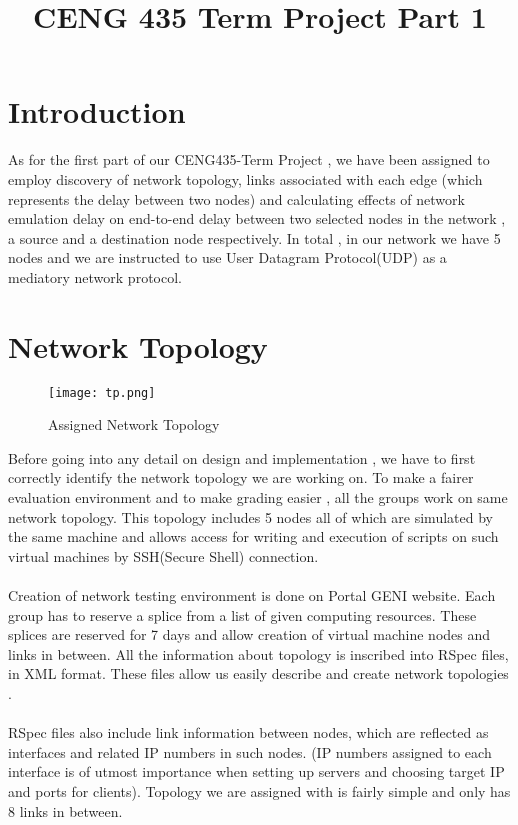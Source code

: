 \documentclass[conference]{IEEEtran}
\begin{document}
\title{CENG 435 Term Project Part 1}

\author{
\and
{}
}

\maketitle


\section{Introduction}

As for the first part of our CENG435-Term Project , we have been assigned to employ discovery of network topology, links associated with each edge (which represents the delay between two nodes) and calculating effects of network emulation delay on end-to-end delay between two selected nodes in the network , a source and a destination node respectively. In total , in our network we have 5 nodes and  we are instructed to use User Datagram Protocol(UDP) as a mediatory network protocol.


\section{Network Topology}

\begin{figure}[htp]
    \centering
    \texttt{[image: tp.png]}
    \caption{Assigned Network Topology}
    \label{fig:topology}
\end{figure}

Before going into any detail on design and implementation , we have to first correctly identify the network topology we are working on. To make a fairer evaluation environment and to make grading easier , all the groups work on same network topology. This topology includes 5 nodes all of which are simulated by the same machine and allows access for writing and execution of scripts on such virtual machines by SSH(Secure Shell) connection. \\
\\
Creation of network testing environment is done on Portal GENI website. Each group has to reserve a splice from a list of given computing resources. These splices are reserved for 7 days and allow creation of virtual machine nodes and links in between. All the information about topology is inscribed into RSpec files, in XML format. These files allow us easily describe and create network topologies .\\
\\
RSpec files also include link information between nodes, which are reflected as interfaces and related IP numbers in such nodes. (IP numbers assigned to each interface is of utmost importance when setting up servers and choosing target IP and ports for clients). Topology we are assigned with is fairly simple and only has 8 links in between.
\end{document}
